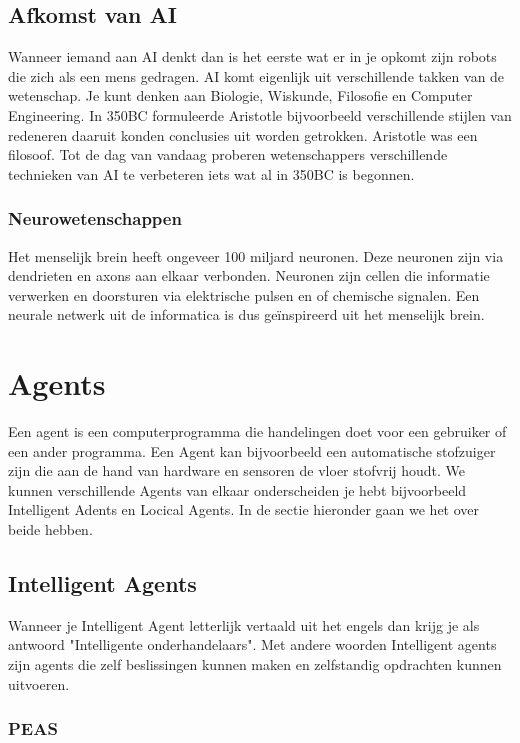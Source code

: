 \documentclass{article}
\begin{document}
\subsection{Afkomst van AI}

Wanneer iemand aan AI denkt dan is het eerste wat er in je opkomt zijn robots die zich als een mens gedragen. AI komt eigenlijk uit verschillende takken van de wetenschap. Je kunt denken aan Biologie, Wiskunde, Filosofie en Computer Engineering. In 350BC formuleerde Aristotle bijvoorbeeld verschillende stijlen van redeneren daaruit konden conclusies uit worden getrokken. Aristotle was een filosoof\cite{aris}. Tot de dag van vandaag proberen wetenschappers verschillende technieken van AI te verbeteren iets wat al in 350BC is begonnen.

\subsubsection{Neurowetenschappen}

Het menselijk brein heeft ongeveer 100 miljard neuronen. Deze neuronen zijn via dendrieten en axons aan elkaar verbonden. Neuronen zijn cellen die informatie verwerken en doorsturen via elektrische pulsen en of chemische signalen\cite{neuron}. Een neurale netwerk uit de informatica is dus geïnspireerd uit het menselijk brein.

\section{Agents}
Een agent is een computerprogramma die handelingen doet voor een gebruiker of een ander programma\cite{agent}. Een Agent kan bijvoorbeeld een automatische stofzuiger zijn die aan de hand van hardware en sensoren de vloer stofvrij houdt.
We kunnen verschillende Agents van elkaar onderscheiden je hebt bijvoorbeeld Intelligent Adents en Locical Agents. In de sectie hieronder gaan we het over beide hebben.

\subsection{Intelligent Agents}

Wanneer je Intelligent Agent letterlijk vertaald uit het engels dan krijg je als antwoord "Intelligente onderhandelaars"\cite{intelligent-agent}. Met andere woorden Intelligent agents zijn agents die zelf beslissingen kunnen maken en zelfstandig opdrachten kunnen uitvoeren.

\subsubsection{PEAS}
\end{document}
